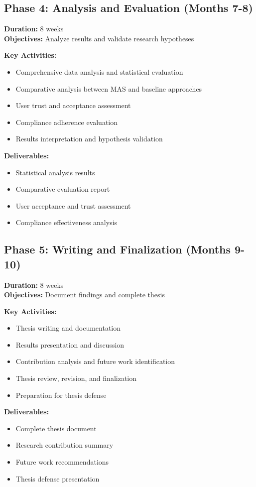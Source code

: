 \subsection{Phase 4: Analysis and Evaluation (Months 7-8)}
\textbf{Duration:} 8 weeks\\
\textbf{Objectives:} Analyze results and validate research hypotheses

\textbf{Key Activities:}
\begin{itemize}
    \item Comprehensive data analysis and statistical evaluation
    \item Comparative analysis between MAS and baseline approaches
    \item User trust and acceptance assessment
    \item Compliance adherence evaluation
    \item Results interpretation and hypothesis validation
\end{itemize}

\textbf{Deliverables:}
\begin{itemize}
    \item Statistical analysis results
    \item Comparative evaluation report
    \item User acceptance and trust assessment
    \item Compliance effectiveness analysis
\end{itemize}

\subsection{Phase 5: Writing and Finalization (Months 9-10)}
\textbf{Duration:} 8 weeks\\
\textbf{Objectives:} Document findings and complete thesis

\textbf{Key Activities:}
\begin{itemize}
    \item Thesis writing and documentation
    \item Results presentation and discussion
    \item Contribution analysis and future work identification
    \item Thesis review, revision, and finalization
    \item Preparation for thesis defense
\end{itemize}

\textbf{Deliverables:}
\begin{itemize}
    \item Complete thesis document
    \item Research contribution summary
    \item Future work recommendations
    \item Thesis defense presentation
\end{itemize}

